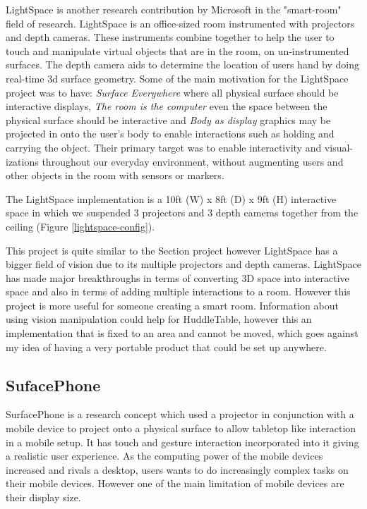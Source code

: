LightSpace is another research contribution by Microsoft in the "smart-room" field of research\cite{lightspace}. LightSpace is an office-sized room instrumented with projectors and depth cameras. These instruments combine together to help the user to touch and manipulate virtual objects that are in the room, on un-instrumented surfaces. The depth camera aids to determine the location of users hand by doing real-time 3d surface geometry. Some of the main motivation for the LightSpace project was to have: 
\emph{Surface Everywhere} where all physical surface should be interactive displays, 
\emph{The room is the computer} even the space between the physical surface should be interactive and 
\emph{Body as display} graphics may be projected in onto the user's body to enable interactions such as holding and carrying the object.
Their primary target was to enable interactivity and visual- izations throughout our everyday environment, without augmenting users and other objects in the room with sensors or markers\cite{lightspace}.

The LightSpace implementation is  a 10ft (W) x 8ft (D) x 9ft (H) interactive space in which we suspended 3 projectors and 3 depth cameras together from the ceiling (Figure \ref{lightspace-config})\cite{lightspace}.

This project is quite similar to the Section  project however LightSpace has a bigger field of vision due to its multiple projectors and depth cameras. LightSpace has made major breakthroughs in terms of converting 3D space into interactive space and also in terms of adding multiple interactions to a room. However this project is more useful for someone creating a smart room. Information about using vision manipulation could help for HuddleTable, however this an implementation that is fixed to an area and cannot be moved, which goes against my idea of having a very portable product that could be set up anywhere. 

\subsection{SufacePhone}

SurfacePhone\cite{surfacephone} is a research concept which used
a projector in conjunction with a mobile device to project onto a
physical surface to allow tabletop like interaction in a mobile setup.
It has touch and gesture interaction incorporated into it giving a
realistic user experience. As the computing power of the mobile devices
increased and rivals a desktop, users wants to do increasingly complex
tasks on their mobile devices. However one of the main limitation
of mobile devices are their display size. 

